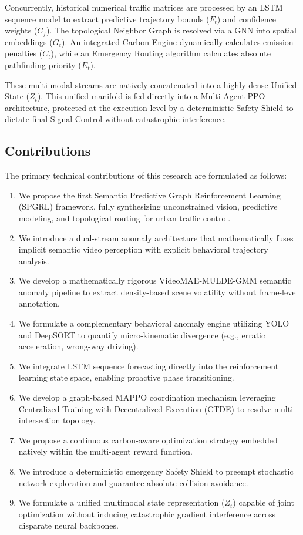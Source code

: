 \documentclass[journal]{IEEEtran}
\begin{document}
Concurrently, historical numerical traffic matrices are processed by an LSTM sequence model to extract predictive trajectory bounds ($F_t$) and confidence weights ($C_f$). The topological Neighbor Graph is resolved via a GNN into spatial embeddings ($G_t$). An integrated Carbon Engine dynamically calculates emission penalties ($C_t$), while an Emergency Routing algorithm calculates absolute pathfinding priority ($E_t$).

These multi-modal streams are natively concatenated into a highly dense Unified State ($Z_t$). This unified manifold is fed directly into a Multi-Agent PPO architecture, protected at the execution level by a deterministic Safety Shield to dictate final Signal Control without catastrophic interference.

\subsection{Contributions}
The primary technical contributions of this research are formulated as follows:
\begin{enumerate}
    \item We propose the first Semantic Predictive Graph Reinforcement Learning (SPGRL) framework, fully synthesizing unconstrained vision, predictive modeling, and topological routing for urban traffic control.
    \item We introduce a dual-stream anomaly architecture that mathematically fuses implicit semantic video perception with explicit behavioral trajectory analysis.
    \item We develop a mathematically rigorous VideoMAE-MULDE-GMM semantic anomaly pipeline to extract density-based scene volatility without frame-level annotation.
    \item We formulate a complementary behavioral anomaly engine utilizing YOLO and DeepSORT to quantify micro-kinematic divergence (e.g., erratic acceleration, wrong-way driving).
    \item We integrate LSTM sequence forecasting directly into the reinforcement learning state space, enabling proactive phase transitioning.
    \item We develop a graph-based MAPPO coordination mechanism leveraging Centralized Training with Decentralized Execution (CTDE) to resolve multi-intersection topology.
    \item We propose a continuous carbon-aware optimization strategy embedded natively within the multi-agent reward function.
    \item We introduce a deterministic emergency Safety Shield to preempt stochastic network exploration and guarantee absolute collision avoidance.
    \item We formulate a unified multimodal state representation ($Z_t$) capable of joint optimization without inducing catastrophic gradient interference across disparate neural backbones.
\end{enumerate}
\end{document}
